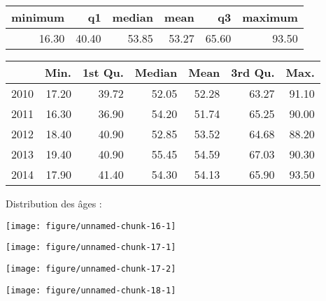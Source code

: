 \documentclass[11pt,a4paper]{article}\usepackage[]{graphicx}\usepackage[]{color}
\makeatletter
\def\maxwidth{ %
  \ifdim\Gin@nat@width>\linewidth
    \linewidth
  \else
    \Gin@nat@width
  \fi
}
\newenvironment{knitrout}{}{} %
\makeatother
\begin{document}
\begin{table}[ht]
\centering
\begin{tabular}{rrrrrr}
  \hline
minimum & q1 & median & mean & q3 & maximum \\ 
  \hline
16.30 & 40.40 & 53.85 & 53.27 & 65.60 & 93.50 \\ 
   \hline
\end{tabular}
\end{table}
\begin{table}[H]
\centering
\begin{tabular}{rrrrrrr}
  \hline
 & Min. & 1st Qu. & Median & Mean & 3rd Qu. & Max. \\ 
  \hline
2010 & 17.20 & 39.72 & 52.05 & 52.28 & 63.27 & 91.10 \\ 
  2011 & 16.30 & 36.90 & 54.20 & 51.74 & 65.25 & 90.00 \\ 
  2012 & 18.40 & 40.90 & 52.85 & 53.52 & 64.68 & 88.20 \\ 
  2013 & 19.40 & 40.90 & 55.45 & 54.59 & 67.03 & 90.30 \\ 
  2014 & 17.90 & 41.40 & 54.30 & 54.13 & 65.90 & 93.50 \\ 
   \hline
\end{tabular}
\end{table}


Distribution des âges :

\begin{knitrout}
\color{fgcolor}
\texttt{[image: figure/unnamed-chunk-16-1]} 

\end{knitrout}

\begin{knitrout}
\color{fgcolor}
\texttt{[image: figure/unnamed-chunk-17-1]} 

\texttt{[image: figure/unnamed-chunk-17-2]} 

\end{knitrout}

\begin{knitrout}
\color{fgcolor}
\texttt{[image: figure/unnamed-chunk-18-1]} 

\end{knitrout}
\end{document}
